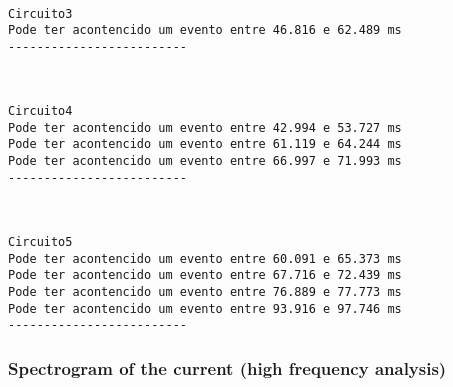 \documentclass[11pt]{article}
\begin{document}
    \begin{center}
    \end{center}
    { \hspace*{\fill} \\}
    
    \begin{Verbatim}[commandchars=\\\{\}]
Circuito3
Pode ter acontencido um evento entre 46.816 e 62.489 ms
-------------------------
    \end{Verbatim}

    \begin{center}
    \end{center}
    { \hspace*{\fill} \\}
    
    \begin{Verbatim}[commandchars=\\\{\}]
Circuito4
Pode ter acontencido um evento entre 42.994 e 53.727 ms
Pode ter acontencido um evento entre 61.119 e 64.244 ms
Pode ter acontencido um evento entre 66.997 e 71.993 ms
-------------------------
    \end{Verbatim}

    \begin{center}
    \end{center}
    { \hspace*{\fill} \\}
    
    \begin{Verbatim}[commandchars=\\\{\}]
Circuito5
Pode ter acontencido um evento entre 60.091 e 65.373 ms
Pode ter acontencido um evento entre 67.716 e 72.439 ms
Pode ter acontencido um evento entre 76.889 e 77.773 ms
Pode ter acontencido um evento entre 93.916 e 97.746 ms
-------------------------
    \end{Verbatim}

    \hypertarget{spectrogram-of-the-current-high-frequency-analysis}{%
\subsubsection{Spectrogram of the current (high frequency
analysis)}\label{spectrogram-of-the-current-high-frequency-analysis}}
\end{document}

